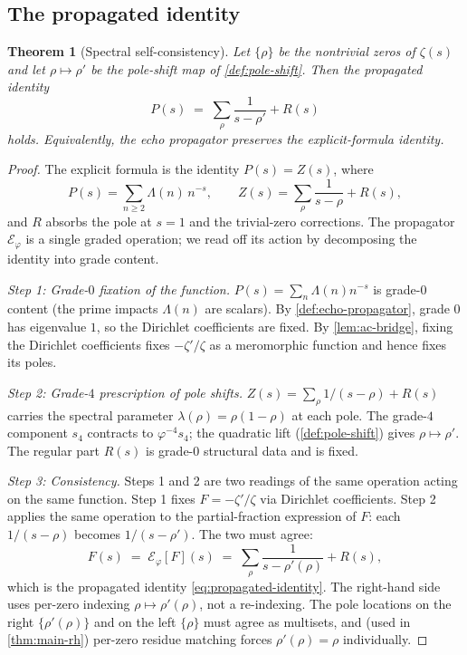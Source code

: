\documentclass[11pt,a4paper]{article}
\theoremstyle{plain}
\newtheorem{theorem}{Theorem}[section]
\theoremstyle{definition}
\theoremstyle{remark}
\numberwithin{equation}{section}
\providecommand{\vp}{\varphi}
\providecommand{\EF}{\mathcal{E}}
\begin{document}
\subsection{The propagated identity}

\begin{theorem}[Spectral self-consistency]
\label{thm:spectral-self-consistency}
Let $\{\rho\}$ be the nontrivial zeros of $\zeta(s)$ and let
$\rho \mapsto \rho'$ be the pole-shift map of
\cref{def:pole-shift}.  Then the propagated identity
\begin{equation}\label{eq:propagated-identity}
  P(s) \;=\; \sum_\rho \frac{1}{s - \rho'} + R(s)
\end{equation}
holds.  Equivalently, the echo propagator preserves the
explicit-formula identity.
\end{theorem}

\begin{proof}
The explicit formula is the identity $P(s) = Z(s)$, where
\[
  P(s) = \sum_{n \ge 2} \Lambda(n)\, n^{-s},
  \qquad
  Z(s) = \sum_\rho \frac{1}{s - \rho} + R(s),
\]
and $R$ absorbs the pole at $s = 1$ and the trivial-zero
corrections.  The propagator $\EF_\vp$ is a single graded
operation; we read off its action by decomposing the identity
into grade content.

\smallskip\emph{Step 1: Grade-$0$ fixation of the function.}
$P(s) = \sum_n \Lambda(n) n^{-s}$ is grade-$0$ content (the
prime impacts $\Lambda(n)$ are scalars).  By
\cref{def:echo-propagator}, grade $0$ has eigenvalue $1$, so the
Dirichlet coefficients are fixed.  By \cref{lem:ac-bridge},
fixing the Dirichlet coefficients fixes $-\zeta'/\zeta$ as a
meromorphic function and hence fixes its poles.

\smallskip\emph{Step 2: Grade-$4$ prescription of pole shifts.}
$Z(s) = \sum_\rho 1/(s - \rho) + R(s)$ carries the spectral
parameter $\lambda(\rho) = \rho(1 - \rho)$ at each pole.  The
grade-$4$ component $s_4$ contracts to $\vp^{-4} s_4$; the
quadratic lift (\cref{def:pole-shift}) gives $\rho \mapsto \rho'$.
The regular part $R(s)$ is grade-$0$ structural data and is fixed.

\smallskip\emph{Step 3: Consistency.}  Steps 1 and 2 are two
readings of the same operation acting on the same function.
Step 1 fixes $F = -\zeta'/\zeta$ via Dirichlet coefficients.
Step 2 applies the same operation to the partial-fraction
expression of $F$: each $1/(s - \rho)$ becomes $1/(s - \rho')$.
The two must agree:
\[
  F(s) \;=\; \EF_\vp[F](s) \;=\; \sum_\rho \frac{1}{s - \rho'(\rho)} + R(s),
\]
which is the propagated identity \eqref{eq:propagated-identity}.
The right-hand side uses per-zero indexing $\rho \mapsto
\rho'(\rho)$, not a re-indexing.  The pole locations on the
right $\{\rho'(\rho)\}$ and on the left $\{\rho\}$ must agree as
multisets, and (used in \cref{thm:main-rh}) per-zero residue
matching forces $\rho'(\rho) = \rho$ individually.
\end{proof}
\end{document}
